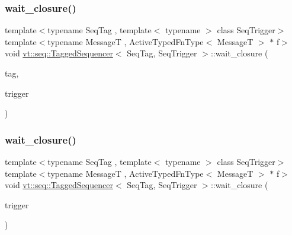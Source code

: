 \mbox{\label{structvt_1_1seq_1_1_tagged_sequencer_a54b83e9239a17a4fd75f8c2c9ac59cee}} 
\subsubsection{\texorpdfstring{wait\+\_\+closure()}{wait\_closure()}\hspace{0.1cm}{\footnotesize\ttfamily [1/2]}}
{\footnotesize\ttfamily template$<$typename Seq\+Tag , template$<$ typename $>$ class Seq\+Trigger$>$ \\
template$<$typename MessageT , Active\+Typed\+Fn\+Type$<$ Message\+T $>$ $\ast$ f$>$ \\
void \hyperlink{structvt_1_1seq_1_1_tagged_sequencer}{vt\+::seq\+::\+Tagged\+Sequencer}$<$ Seq\+Tag, Seq\+Trigger $>$\+::wait\+\_\+closure (\begin{DoxyParamCaption}\item[{\hyperlink{namespacevt_a84ab281dae04a52a4b243d6bf62d0e52}{Tag\+Type} const \&}]{tag,  }\item[{\hyperlink{namespacevt_1_1seq_aa88b0d93284d188be39704024ab58b8f}{Seq\+Non\+Migratable\+Trigger\+Type}$<$ MessageT $>$}]{trigger }\end{DoxyParamCaption})}

\mbox{\label{structvt_1_1seq_1_1_tagged_sequencer_ac1ba35f793dcb35a47d4e73ec6ab29d4}} 
\subsubsection{\texorpdfstring{wait\+\_\+closure()}{wait\_closure()}\hspace{0.1cm}{\footnotesize\ttfamily [2/2]}}
{\footnotesize\ttfamily template$<$typename Seq\+Tag , template$<$ typename $>$ class Seq\+Trigger$>$ \\
template$<$typename MessageT , Active\+Typed\+Fn\+Type$<$ Message\+T $>$ $\ast$ f$>$ \\
void \hyperlink{structvt_1_1seq_1_1_tagged_sequencer}{vt\+::seq\+::\+Tagged\+Sequencer}$<$ Seq\+Tag, Seq\+Trigger $>$\+::wait\+\_\+closure (\begin{DoxyParamCaption}\item[{\hyperlink{namespacevt_1_1seq_aa88b0d93284d188be39704024ab58b8f}{Seq\+Non\+Migratable\+Trigger\+Type}$<$ MessageT $>$}]{trigger }\end{DoxyParamCaption})}

